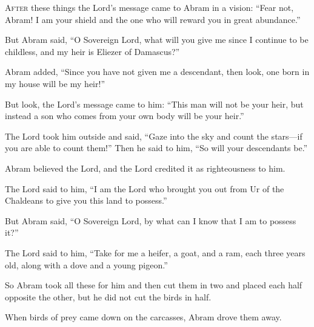 \begin{scripture}
 \allowchapbreak\hypertarget{ch-genesis-15}{}\lettrine[lines=5]{\color{pentateuch}A}{\textsc{fter}} these things the Lord's message came to Abram in a vision: ``Fear not, Abram! I am your shield and the one who will reward you in great abundance.''\everypar{}
\\\indent{} But Abram said, ``O Sovereign Lord, what will you give me since I continue to be childless, and my heir is Eliezer of Damascus?''
 Abram added, ``Since you have not given me a descendant, then look, one born in my house will be my heir!''
\everypar{}

 But look, the Lord's message came to him: ``This man will not be your heir, but instead a son who comes from your own body will be your heir.''
 The Lord took him outside and said, ``Gaze into the sky and count the stars---if you are able to count them!'' Then he said to him, ``So will your descendants be.''
\everypar{}

 Abram believed the Lord, and the Lord credited it as righteousness to him.
\everypar{}

 The Lord said to him, ``I am the Lord who brought you out from Ur of the Chaldeans to give you this land to possess.''
 But Abram said, ``O Sovereign Lord, by what can I know that I am to possess it?''
\everypar{}

 The Lord said to him, ``Take for me a heifer, a goat, and a ram, each three years old, along with a dove and a young pigeon.''
 So Abram took all these for him and then cut them in two and placed each half opposite the other, but he did not cut the birds in half.
 When birds of prey came down on the carcasses, Abram drove them away.
\everypar{}


\end{scripture}
